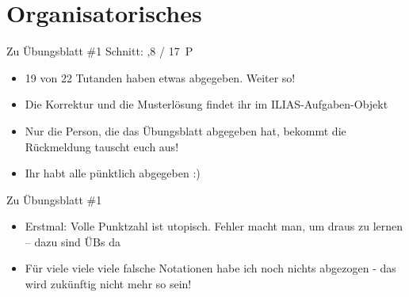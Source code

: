 
\newcommand{\handout}{}



\morescalingdelimiters



\section{Organisatorisches}

\begin{frame}{Zu Übungsblatt \#1}
	Schnitt: ,8 / 17~P

	\begin{itemize}[<+->]
		\item 19 von 22 Tutanden haben etwas abgegeben. Weiter so!
		\item Die Korrektur und die Musterlösung findet ihr im ILIAS-Aufgaben-Objekt
		\item Nur die Person, die das Übungsblatt abgegeben hat, bekommt die Rückmeldung \impl tauscht euch aus!
		\item Ihr habt alle pünktlich abgegeben :)
	\end{itemize}
\end{frame}

\begin{frame}{Zu Übungsblatt \#1}	
	\begin{itemize}[<+->]
		\item Erstmal: Volle Punktzahl ist utopisch. Fehler macht man, um draus zu lernen – dazu sind ÜBs da
		\item Für viele viele viele falsche Notationen habe ich noch nichts abgezogen - das wird zukünftig nicht mehr so sein!
	\end{itemize}
\end{frame}

